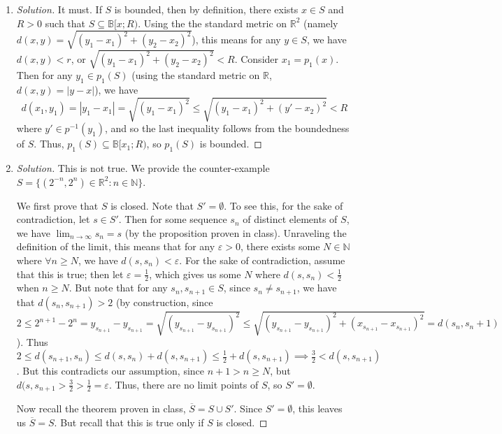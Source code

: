 \documentclass{article}
\newcommand{\N}{{\mathbb N}}
\newcommand{\R}{{\mathbb R}}
\newcommand{\ep}{{\varepsilon}}
\begin{document}
\begin{enumerate}
	\item \begin{proof}[Solution]\let\qed\relax
		It must. If $S$ is bounded, then by definition,
		there exists $x \in S$ and $R>0$ such that
		$S \subseteq \mathbb{B}[x;R)$.
		Using the the standard metric on $\R^2$
		(namely $d(x,y) = \sqrt{(y_1 - x_1)^2 + (y_2 - x_2)^2}$),
		this means for any $y \in S$, we have
		$d(x,y) < r$, or $\sqrt{(y_1 - x_1)^2 + (y_2 - x_2)^2} < R$.
		Consider $x_1 = p_1(x)$.
		Then for any $y_1 \in p_1(S)$
		(using the standard metric on $\R$, $d(x,y) = |y-x|$), we have
		\[
			d(x_1,y_1) = |y_1 - x_1| = \sqrt{(y_1-x_1)^2}
			\leq \sqrt{(y_1-x_1)^2 + (y' - x_2)^2} < R
		\]
		where $y' \in p^{-1}(y_1)$,
		and so the last inequality follows from the boundedness of $S$.
		Thus, $p_1(S) \subseteq \mathbb{B}[x_1;R)$,
		so $p_1(S)$ is bounded.
	\end{proof}
	\item \begin{proof}[Solution]\let\qed\relax
		This is not true. We provide the counter-example
		$S = \{(2^{-n}, 2^n) \in \R^2 \colon n \in \N\}$.

		We first prove that $S$ is closed.
		Note that $S' = \emptyset$.
		To see this, for the sake of contradiction, let $s \in S'$.
		Then for some sequence $s_n$ of distinct elements of $S$,
		we have $\lim_{n\to\infty} s_n = s$ (by the proposition proven in class).
		Unraveling the definition of the limit, this means that for
		any $\ep > 0$, there exists some $N \in \N$ where $\forall n \geq N$,
		we have $d(s,s_n) < \ep$.
		For the sake of contradiction, assume that this is true;
		then let $\ep = \frac12$, which gives us some $N$
		where $d(s,s_n) < \frac12$ when $n \geq N$.
		But note that for any $s_n, s_{n+1} \in S$, since $s_n \neq s_{n+1}$,
		we have that $d(s_n, s_{n+1}) > 2$
		(by construction, since $2 \leq 2^{n+1} - 2^n =
		y_{s_{n+1}} - y_{s_{n+1}} = \sqrt{(y_{s_{n+1}} - y_{s_{n+1}})^2}
		\leq \sqrt{(y_{s_{n+1}} - y_{s_{n+1}})^2 + (x_{s_{n+1}} - x_{s_{n+1}})^2} = d(s_n,s_n+1)$).
		Thus $2 \leq d(s_{n+1},s_n) \leq d(s,s_n) + d(s,s_{n+1}) \leq \frac12 + d(s,s_{n+1})
		\implies \frac32  < d(s,s_{n+1})$.
		But this contradicts our assumption, since $n+1 > n \geq N$,
		but $d(s,s_{n+1} > \frac32 > \frac12 = \ep$.
		Thus, there are no limit points of $S$, so $S' = \emptyset$.
		
		Now recall the theorem proven in class, $\overline{S} = S \cup S'$.
		Since $S' = \emptyset$, this leaves us $\overline{S} = S$.
		But recall that this is true only if $S$ is closed.


\end{proof}
\end{enumerate}
\end{document}
